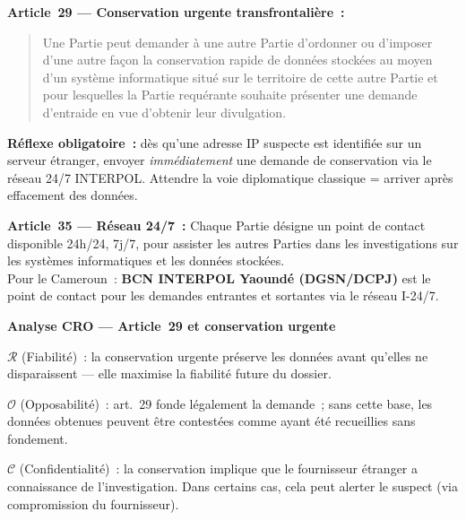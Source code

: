 \begin{boxjuris}
\textbf{Article~29 --- Conservation urgente transfrontalière~:}
\begin{quote}
Une Partie peut demander à une autre Partie d'ordonner ou d'imposer
d'une autre façon la conservation rapide de données stockées au moyen
d'un système informatique situé sur le territoire de cette autre
Partie et pour lesquelles la Partie requérante souhaite présenter une
demande d'entraide en vue d'obtenir leur divulgation.
\end{quote}
\textbf{Réflexe obligatoire~:} dès qu'une adresse IP suspecte est
identifiée sur un serveur étranger, envoyer \emph{immédiatement} une
demande de conservation via le réseau 24/7 INTERPOL. Attendre la voie
diplomatique classique = arriver après effacement des données.
\end{boxjuris}

\begin{boxjuris}
\textbf{Article~35 --- Réseau 24/7~:}
Chaque Partie désigne un point de contact disponible 24h/24, 7j/7,
pour assister les autres Parties dans les investigations sur les
systèmes informatiques et les données stockées.\\[0.3ex]
Pour le Cameroun~: \textbf{BCN INTERPOL Yaoundé (DGSN/DCPJ)} est le
point de contact pour les demandes entrantes et sortantes via le réseau
I-24/7.
\end{boxjuris}

\begin{boxCRO}
\textbf{Analyse CRO --- Article~29 et conservation urgente}

$\mathcal{R}$ (Fiabilité)~: la conservation urgente préserve les données
avant qu'elles ne disparaissent --- elle maximise la fiabilité future
du dossier.

$\mathcal{O}$ (Opposabilité)~: art.~29 fonde légalement la demande~;
sans cette base, les données obtenues peuvent être contestées comme
ayant été recueillies sans fondement.

$\mathcal{C}$ (Confidentialité)~: la conservation implique que le
fournisseur étranger a connaissance de l'investigation. Dans certains
cas, cela peut alerter le suspect (via compromission du fournisseur).

\end{boxCRO}

